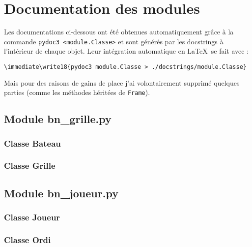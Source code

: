 \chapter{Documentation des modules}

Les documentations ci-dessous ont été obtenues automatiquement grâce à la commande \texttt{pydoc3 <module.Classe>} et sont générés par les docstrings à l'intérieur de chaque objet. Leur intégration automatique en \LaTeX\ se fait avec :
\begin{verbatim}
\immediate\write18{pydoc3 module.Classe > ./docstrings/module.Classe}

\end{verbatim}
Mais pour des raisons de gains de place j'ai volontairement supprimé quelques parties (comme les méthodes héritées de \texttt{Frame}).
\section{Module bn\_grille.py}
\subsection{Classe Bateau}
\immediate{}


\newpage

\subsection{Classe Grille}
\immediate{}


\section{Module bn\_joueur.py}
\subsection{Classe Joueur}
\immediate{}


\subsection{Classe Ordi}
\immediate{}


